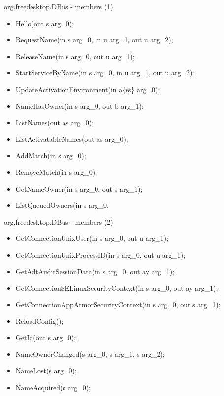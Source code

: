 \documentclass{beamer}
\begin{document}
\begin{frame}{org.freedesktop.DBus - members (1)}
  \begin{itemize}
\item Hello(out s arg\_0);
\item RequestName(in  s arg\_0,
            in  u arg\_1,
            out u arg\_2);
\item ReleaseName(in  s arg\_0,
            out u arg\_1);
\item StartServiceByName(in  s arg\_0,
                   in  u arg\_1,
                   out u arg\_2);
\item UpdateActivationEnvironment(in  a\{ss\} arg\_0);
\item NameHasOwner(in  s arg\_0,
             out b arg\_1);
\item ListNames(out as arg\_0);
\item ListActivatableNames(out as arg\_0);
\item AddMatch(in  s arg\_0);
\item RemoveMatch(in  s arg\_0);
\item GetNameOwner(in  s arg\_0,
             out s arg\_1);
\item ListQueuedOwners(in  s arg\_0,
  \end{itemize}
\end{frame}

\begin{frame}{org.freedesktop.DBus - members (2)}
  \begin{itemize}
\item GetConnectionUnixUser(in  s arg\_0,
                      out u arg\_1);
\item GetConnectionUnixProcessID(in  s arg\_0,
                           out u arg\_1);
\item GetAdtAuditSessionData(in  s arg\_0,
                       out ay arg\_1);
\item GetConnectionSELinuxSecurityContext(in  s arg\_0,
                                    out ay arg\_1);
\item GetConnectionAppArmorSecurityContext(in  s arg\_0,
                                     out s arg\_1);
\item ReloadConfig();
\item GetId(out s arg\_0);



\item NameOwnerChanged(s arg\_0,
                 s arg\_1,
                 s arg\_2);
\item NameLost(s arg\_0);
\item NameAcquired(s arg\_0);
  \end{itemize}
\end{frame}
\end{document}
